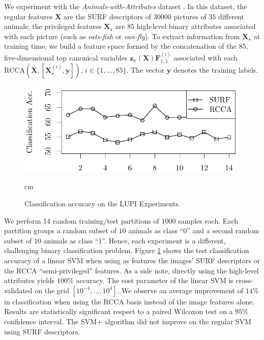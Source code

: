 \documentclass{article}
\begin{document}
  We experiment with the \emph{Animals-with-Attributes} dataset
  \citep{Lampert09}. In this dataset, the regular features $\bm X$ are the SURF
  descriptors of $30000$ pictures of $35$ different animals; the privileged
  features $\bm X_\star$ are $85$ high-level binary attributes associated with
  each picture (such as \emph{eats-fish} or \emph{can-fly}). To extract
  information from $\bm X_\star$ at training time, we build a feature space
  formed by the concatenation of the $85$, five-dimensional top canonical
  variables $\bm z_x(\bm X)\bm F^{(i)}_{1:5}$ associated with each
  $\mathrm{RCCA}(\bm X, [\bm X_\star^{(i)}, \bm y])$, $i \in \{ 1, \ldots,
  85\}$.  The vector $\bm y$ denotes the training labels.

  \begin{figure}[h!]
    \begin{center}
    \includegraphics[width=\linewidth]{figures/lupi.pdf}
    \end{center}
     cm
    \caption{Classification accuracy on the LUPI Experiments.}
    \label{fig:animals}
  \end{figure}

  We perform 14 random training/test partitions of $1000$ samples each. Each
  partition groups a random subset of $10$ animals as class ``$0$'' and a
  second random subset of $10$ animals as class ``$1$''. Hence, each experiment 
  is a different, challenging binary classification problem. Figure
  \ref{fig:animals} shows the test classification accuracy of a linear SVM when
  using as features the images' SURF descriptors or the RCCA ``semi-privileged''
  features. As a side note, directly using the high-level attributes yields
  $100\%$ accuracy.  The cost parameter of the linear SVM is cross-validated on
  the grid $[10^{-4}, \ldots, 10^4]$. We observe an average improvement of
  $14\%$ in classification when using the RCCA basis instead of the image
  features alone.  Results are statistically significant respect to a paired
  Wilcoxon test on a $95\%$ confidence interval. The SVM+ algorithm
  \citep{Vapnik09} did not improve on the regular SVM
  using SURF descriptors.
\end{document}
